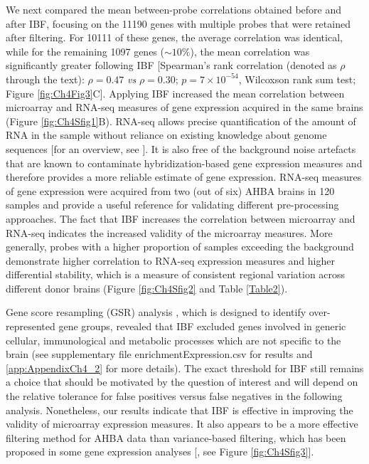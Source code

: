 We next compared the mean between-probe correlations obtained before and after IBF, focusing on the \num{11190} genes with multiple probes that were retained after filtering.
For \num{10111} of these genes, the average correlation was identical, while for the remaining \num{1097} genes ($\sim10\%$), the mean correlation was significantly greater following IBF [Spearman’s rank correlation (denoted as $\rho$ through the text): $\rho = 0.47$ \textit{vs} $\rho = 0.30$; $p = 7 \times 10^{-54}$, Wilcoxson rank sum test; Figure \ref{fig:Ch4Fig3}C]. Applying IBF increased the mean correlation between microarray and RNA-seq measures of gene expression acquired in the same brains (Figure \ref{fig:Ch4Sfig1}B). RNA-seq allows precise quantification of the amount of RNA in the sample without reliance on existing knowledge about genome sequences [for an overview, see \citet{Wang2009,Kukurba2015}]. It is also free of the background noise artefacts that are known to contaminate hybridization-based gene expression measures and therefore provides a more reliable estimate of gene expression. RNA-seq measures of gene expression were acquired from two (out of six) AHBA brains in 120 samples and provide a useful reference for validating different pre-processing approaches. The fact that IBF increases the correlation between microarray and RNA-seq indicates the increased validity of the microarray measures. More generally, probes with a higher proportion of samples exceeding the background demonstrate higher correlation to RNA-seq expression measures and higher differential stability, which is a measure of consistent regional variation across different donor brains (Figure \ref{fig:Ch4Sfig2} and Table \ref{Table2}).

Gene score resampling (GSR) analysis \citep{Gillis2010}, which is designed to identify over-represented gene groups, revealed that IBF excluded genes involved in generic cellular, immunological and metabolic processes which are not specific to the brain (see supplementary file enrichmentExpression.csv for results and \ref{app:AppendixCh4_2} for more details). The exact threshold for IBF still remains a choice that should be motivated by the question of interest and will depend on the relative tolerance for false positives versus false negatives in the following analysis. Nonetheless, our results indicate that IBF is effective in improving the validity of microarray expression measures. It also appears to be a more effective filtering method for AHBA data than variance-based filtering, which has been proposed in some gene expression analyses [\citep{Hackstadt2009}, see Figure \ref{fig:Ch4Sfig3}].

